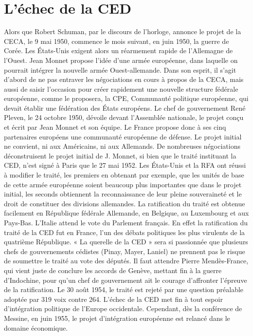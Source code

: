 \documentclass{report}%
\begin{document}
\section{L'échec de la CED}
Alors que Robert Schuman, par le discours de l'horloge, annonce le projet de la CECA, le 9 mai 1950, commence le mois suivant, en juin 1950, la guerre de Corée. Les États-Unis exigent alors un réarmement rapide de l'Allemagne de l'Ouest. Jean Monnet propose l'idée d'une armée européenne, dans laquelle on pourrait intégrer la nouvelle armée Ouest-allemande. Dans son esprit, il s'agit d'abord de ne pas entraver les négociations en cours à propos de la CECA, mais aussi de saisir l'occasion pour créer rapidement une nouvelle structure fédérale européenne, comme le proposera, la CPE, Communauté politique européenne, qui devait établir une fédération des États européens. Le chef de gouvernement René Pleven, le 24 octobre 1950, dévoile devant l'Assemblée nationale, le projet conçu et écrit par Jean Monnet et son équipe. Le France propose donc à ses cinq partenaires européens une communauté européenne de défense.
Le projet initial ne convient, ni aux Américains, ni aux Allemands. De nombreuses négociations déconstruisent le projet initial de J. Monnet, si bien que le traité instituant la CED, n'est signé à Paris que le 27 mai 1952. Les États-Unis et la RFA ont réussi à modifier le traité, les premiers en obtenant par exemple, que les unités de base de cette armée européenne soient beaucoup plus importantes que dans le projet initial, les seconds obtiennent la reconnaissance de leur pleine souveraineté et le droit de constituer des divisions allemandes.
La ratification du traité est obtenue facilement en République fédérale Allemande, en Belgique, au Luxembourg et aux Pays-Bas. L'Italie attend le vote du Parlement français. En effet la ratification du traité de la CED fut en France, l'un des débats politiques les plus virulents de la quatrième République. « La querelle de la CED » sera si passionnée que plusieurs chefs de gouvernements cédistes (Pinay, Mayer, Laniel) ne prennent pas le risque de soumettre le traité au vote des députés. Il faut attendre Pierre Mendès-France, qui vient juste de conclure les accords de Genève, mettant fin à la guerre d'Indochine, pour qu'un chef de gouvernement ait le courage d'affronter l'épreuve de la ratification. Le 30 août 1954, le traité est rejeté par une question préalable adoptée par 319 voix contre 264. L'échec de la CED met fin à tout espoir d'intégration politique de l'Europe occidentale. Cependant, dès la conférence de Messine, en juin 1955, le projet d'intégration européenne est relancé dans le domaine économique.
\end{document}
